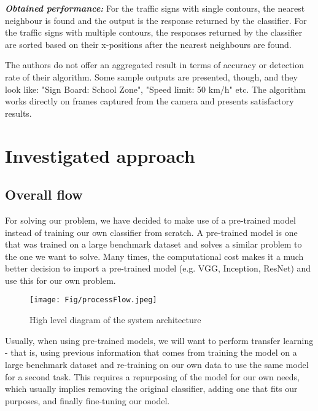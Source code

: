 \documentclass[runningheads,a4paper,11pt]{report}
\begin{document}
\begin{enumerate}
  \textbf{\emph{Obtained performance:}} For the traffic signs with single contours, the nearest neighbour is found and the output is the response returned by the classifier. For the traffic signs with multiple contours, the responses returned by the classifier are sorted based on their x-positions after the nearest neighbours are found.
  
  The authors do not offer an aggregated result in terms of accuracy or detection rate of their algorithm. Some sample outputs are presented, though, and they look like: "Sign Board: School Zone", "Speed limit: 50 km/h" etc. The algorithm works directly on frames captured from the camera and presents satisfactory results.
  
  
\end{enumerate}


\chapter{Investigated approach}
\label{chapter:proposedApproach}

\section{Overall flow}

For solving our problem, we have decided to make use of a pre-trained model instead of training our own classifier from scratch. A pre-trained model is one that was trained on a large benchmark dataset and solves a similar problem to the one we want to solve. Many times, the computational cost makes it a much better decision to import a pre-trained model (e.g. VGG, Inception, ResNet) and use this for our own problem.

\begin{figure}[hbp]
	\centerline{\texttt{[image: Fig/processFlow.jpeg]}}
	\caption{High level diagram of the system architecture \cite{DiveReal19:online}}
	\label{fig:systemFlow}
\end{figure}

Usually, when using pre-trained models, we will want to perform transfer learning - that is, using previous information that comes from training the model on a large benchmark dataset and re-training on our own data to use the same model for a second task. This requires a repurposing of the model for our own needs, which usually implies removing the original classifier, adding one that fits our purposes, and finally fine-tuning our model. 
\end{document}

